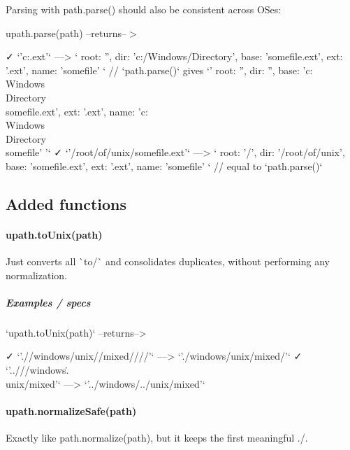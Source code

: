 Parsing with {\ttfamily path.\+parse()} should also be consistent across O\+Ses\+:

{\ttfamily upath.\+parse(path)} --returns--$>$ \begin{DoxyVerb}    ✓ `'c:\Windows\Directory\somefile.ext'`      ---> `{ root: '', dir: 'c:/Windows/Directory', base: 'somefile.ext', ext: '.ext', name: 'somefile' }`
                              // `path.parse()` gives `'{ root: '', dir: '', base: 'c:\\Windows\\Directory\\somefile.ext', ext: '.ext', name: 'c:\\Windows\\Directory\\somefile' }'`
    ✓ `'/root/of/unix/somefile.ext'`             ---> `{ root: '/', dir: '/root/of/unix', base: 'somefile.ext', ext: '.ext', name: 'somefile' }`  // equal to `path.parse()`
\end{DoxyVerb}


\subsection*{Added functions}

\paragraph*{{\ttfamily upath.\+to\+Unix(path)}}

Just converts all \`{}{\ttfamily to}/\`{} and consolidates duplicates, without performing any normalization.

\subparagraph*{Examples / specs}

\begin{DoxyVerb}`upath.toUnix(path)`        --returns-->

    ✓ `'.//windows\//unix//mixed////'`      --->         `'./windows/unix/mixed/'`
    ✓ `'..///windows\..\\unix/mixed'`       --->      `'../windows/../unix/mixed'`
\end{DoxyVerb}


\paragraph*{{\ttfamily upath.\+normalize\+Safe(path)}}

Exactly like {\ttfamily path.\+normalize(path)}, but it keeps the first meaningful {\ttfamily ./}.

